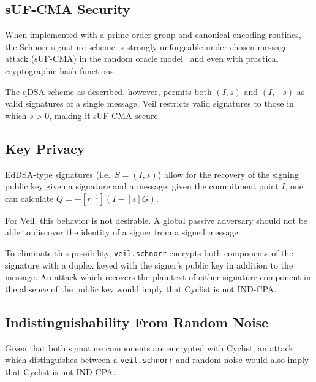 \subsection{sUF-CMA Security}\label{subsec:veil.schnorr-suf-cma}

When implemented with a prime order group and canonical encoding routines, the Schnorr signature scheme is strongly
unforgeable under chosen message attack (sUF-CMA) in the random oracle model~\cite{pointcheval2000} and even with
practical cryptographic hash functions~\cite{neven2009}.

The qDSA scheme as described, however, permits both $(I, s)$ and $(I, -s)$ as valid signatures of a single message.
Veil restricts valid signatures to those in which $s > 0$, making it sUF-CMA secure.

\subsection{Key Privacy}\label{subsec:veil.schnorr-key-privacy}

EdDSA-type signatures (i.e.\ $S=(I,s)$) allow for the recovery of the signing public key given a signature and a
message: given the commitment point $I$, one can calculate $Q=-[r^{-1}](I - [s]G)$.

For Veil, this behavior is not desirable.
A global passive adversary should not be able to discover the identity of a signer from a signed message.

To eliminate this possibility, \texttt{veil.schnorr} encrypts both components of the signature with a duplex keyed with
the signer's public key in addition to the message.
An attack which recovers the plaintext of either signature component in the absence of the public key would imply that
Cyclist is not IND-CPA\@.

\subsection{Indistinguishability From Random Noise}\label{subsec:veil.schnorr-indistinguishability}

Given that both signature components are encrypted with Cyclist, an attack which distinguishes between a
\texttt{veil.schnorr} and random noise would also imply that Cyclist is not IND-CPA\@.
